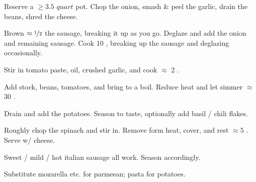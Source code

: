 \begin{preparation}
\item Reserve a $\ge 3.5$ $quart$ pot.
	Chop the onion, smash \& peel the garlic, drain the beans, shred the cheese.

\item Brown $\approx \nicefrac{1}{2}$ the sausage, breaking it up as you go.
	Deglaze and add the onion and remaining sausage.
	Cook 10 \minute, breaking up the sausage and deglazing occasionally.

\item Stir in tomato paste, oil, crushed garlic, and cook $\approx$ 2 \minute.

\item Add stock, beans, tomatoes, and bring to a boil.
	Reduce heat and let simmer $\approx$ 30 \minute.

\item Drain and add the potatoes.
	Season to taste, optionally add basil / chili flakes.

\item Roughly chop the spinach and stir in.
	Remove form heat, cover, and rest $\approx 5$ \minute.
	Serve w/ cheese.
\end{preparation}


\begin{variation}
\item Sweet / mild / hot italian sausage all work. Season accordingly.

\item Substitute mozarella etc. for parmesan; pasta for potatoes.
\end{variation}


\recipeend
